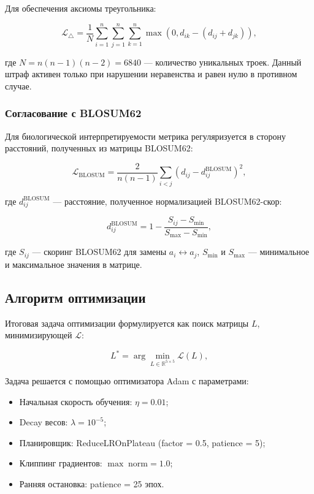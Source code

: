 \documentclass[12pt]{article}
\begin{document}
Для обеспечения аксиомы треугольника:

\begin{equation}
\mathcal{L}_{\triangle} = \frac{1}{N} \sum_{i=1}^{n} \sum_{j=1}^{n} \sum_{k=1}^{n} \max\left(0, d_{ik} - (d_{ij} + d_{jk})\right),
\label{eq:triangle}
\end{equation}

где $N = n(n-1)(n-2) = 6840$ --- количество уникальных троек. Данный штраф активен только при нарушении неравенства и равен нулю в противном случае.

\subsubsection{Согласование с BLOSUM62}

Для биологической интерпретируемости метрика регуляризуется в сторону расстояний, полученных из матрицы BLOSUM62:

\begin{equation}
\mathcal{L}_{\text{BLOSUM}} = \frac{2}{n(n-1)} \sum_{i < j} (d_{ij} - d_{ij}^{\text{BLOSUM}})^2,
\label{eq:blosum}
\end{equation}

где $d_{ij}^{\text{BLOSUM}}$ --- расстояние, полученное нормализацией BLOSUM62-скор:

\begin{equation}
d_{ij}^{\text{BLOSUM}} = 1 - \frac{S_{ij} - S_{\min}}{S_{\max} - S_{\min}},
\label{eq:blosum_dist}
\end{equation}

где $S_{ij}$ --- скоринг BLOSUM62 для замены $a_i \leftrightarrow a_j$, $S_{\min}$ и $S_{\max}$ --- минимальное и максимальное значения в матрице.

\subsection{Алгоритм оптимизации}

Итоговая задача оптимизации формулируется как поиск матрицы $L$, минимизирующей $\mathcal{L}$:

\begin{equation}
L^* = \arg\min_{L \in \mathbb{R}^{5 \times 5}} \mathcal{L}(L),
\label{eq:optim}
\end{equation}

Задача решается с помощью оптимизатора Adam с параметрами:
\begin{itemize}
    \item Начальная скорость обучения: $\eta = 0.01$;
    \item Decay весов: $\lambda = 10^{-5}$;
    \item Планировщик: ReduceLROnPlateau (factor = 0.5, patience = 5);
    \item Клиппинг градиентов: $\max\; \text{norm} = 1.0$;
    \item Ранняя остановка: patience = 25 эпох.
\end{itemize}
\end{document}
